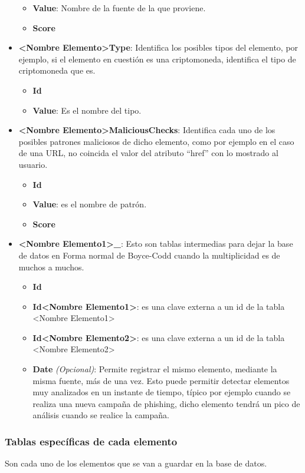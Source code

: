 \begin{itemize}
\begin{itemize}
        \item \textbf{Value}: Nombre de la fuente de la que proviene.
        \item \textbf{Score} 
    \end{itemize}
    \item \textbf{<Nombre Elemento>Type}: Identifica los posibles tipos del elemento, por ejemplo, si el elemento en cuestión es una criptomoneda, identifica el tipo de criptomoneda que es. 
    \begin{itemize}
        \item \textbf{Id}
        \item \textbf{Value}: Es el nombre del tipo.
    \end{itemize}
    \item \textbf{<Nombre Elemento>MaliciousChecks}: Identifica cada uno de los posibles patrones maliciosos de dicho elemento, como por ejemplo en el caso de una URL, no coincida el valor del atributo “href” con lo mostrado al usuario.
    \begin{itemize}
        \item \textbf{Id}
        \item \textbf{Value}: es el nombre de patrón.
        \item \textbf{Score}
    \end{itemize}
    \item \textbf{<Nombre Elemento1>\_<Nombre Elemento2>}: Esto son tablas intermedias para dejar la base de datos en Forma normal de Boyce-Codd cuando la multiplicidad es de muchos a muchos.
    \begin{itemize}
        \item \textbf{Id}
        \item \textbf{Id<Nombre Elemento1>}: es una clave externa a un id de la tabla <Nombre Elemento1> 
        \item \textbf{Id<Nombre Elemento2>}: es una clave externa a un id de la tabla <Nombre Elemento2> 
        \item \textbf{Date} \emph{(Opcional)}: Permite registrar el mismo elemento, mediante la misma fuente, más de una vez. Esto puede permitir detectar elementos muy analizados en un instante de tiempo, típico por ejemplo cuando se realiza una nueva campaña de phishing, dicho elemento tendrá un pico de análisis cuando se realice la campaña.
    \end{itemize}
\end{itemize}

\subsubsection{Tablas específicas de cada elemento}
Son cada uno de los elementos que se van a guardar en la base de datos.

